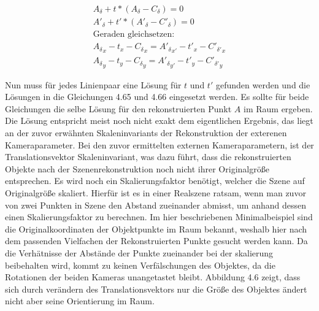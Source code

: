  
\begin{gather*}
	A_\delta + t*(A_\delta - C_\delta) = 0\\
	A'_\delta + t'*(A'_\delta - C'_\delta) = 0\\
	\text{Geraden gleichsetzen:}\\
	{A_\delta}_x - t_x-{C_\delta}_x = 	{A'_\delta}_{x'} - t'_x-{C'_{\delta'}}_x \\
	{A_\delta}_y - t_y-{C_\delta}_y = 	{A'_\delta}_{y'} - t'_y-{C'_{\delta'}}_y 
\end{gather*}

Nun muss für jedes Linienpaar eine Lösung für $t$ und $t'$ gefunden werden und die Lösungen in die Gleichungen 4.65 und 4.66 eingesetzt werden. Es sollte für beide Gleichungen die selbe Lösung für den rekonstruierten Punkt $A$ im Raum ergeben. Die Lösung entspricht meist noch nicht exakt dem eigentlichen Ergebnis, das liegt an der zuvor erwähnten Skaleninvariants der Rekonstruktion der exterenen Kameraparameter. Bei den zuvor ermittelten externen Kameraparametern, ist der Translationsvektor Skaleninvariant, was dazu führt, dass die rekonstruierten Objekte nach der Szenenrekonstruktion noch nicht ihrer Originalgröße entsprechen. Es wird noch ein Skalierungsfaktor benötigt, welcher die Szene auf Originalgröße skaliert. Hierfür ist es in einer Realszene ratsam, wenn man zuvor von zwei Punkten in Szene den Abstand zueinander abmisst, um anhand dessen einen Skalierungsfaktor zu berechnen. Im hier beschriebenen Minimalbeispiel sind die Originalkoordinaten der Objektpunkte im Raum bekannt, weshalb hier nach dem passenden Vielfachen der Rekonstruierten Punkte gesucht werden kann. Da die Verhätnisse der Abstände der Punkte zueinander bei der skalierung beibehalten wird, kommt zu keinen Verfälschungen des Objektes, da die Rotationen der beiden Kameras unangetastet bleibt. Abbildung 4.6 zeigt, dass sich durch verändern des Translationsvektors nur die Größe des Objektes ändert nicht aber seine Orientierung im Raum.

